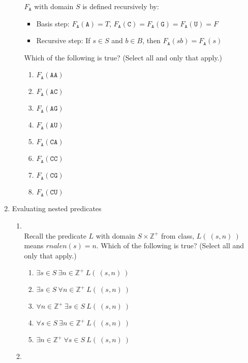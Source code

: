 \documentclass[12pt, oneside]{article}
\newcommand{\A}[0]{\texttt{A}}
\newcommand{\C}[0]{\texttt{C}}
\newcommand{\G}[0]{\texttt{G}}
\newcommand{\U}[0]{\texttt{U}}
\begin{document}
\begin{enumerate}
\begin{enumerate}
$F_{\A}$ with domain $S$ is defined recursively by: 
\begin{itemize}
\item[]Basis step: $F_{\A}(\A) = T$, $F_{\A}(\C) = F_{\A}(\G) = F_{\A}(\U) = F$
\item[]Recursive step: If $s \in S$ and $b \in B$, then $F_{\A}(sb) = F_{\A}(s)$
\end{itemize}

Which of the following is true? (Select  all and only that apply.)
 \begin{enumerate}
    \item $F_\A ( \A\A)$
    \item $F_\A ( \A\C)$
    \item $F_\A ( \A\G)$
    \item $F_\A ( \A\U)$
    \item $F_\A ( \C\A)$
    \item $F_\A ( \C\C)$
    \item $F_\A ( \C\G)$
    \item $F_\A ( \C\U)$
 \end{enumerate}    
     \end{enumerate}
\newpage
\item Evaluating nested predicates
    \begin{enumerate}
    \item \hspace{1in}\\

Recall the predicate $L$ with domain $S \times \mathbb{Z}^+$ from class,
$L(~(s,n)~)$ means $rnalen(s) = n$.
Which of the following is true? (Select  all and only that apply.)
\begin{enumerate}
   \item $\exists s \in S ~\exists n \in \mathbb{Z}^+ ~L(~(s,n)~)$
   \item $\exists s \in S ~\forall n \in \mathbb{Z}^+ ~L(~(s,n)~)$
   \item $\forall n \in \mathbb{Z}^+ ~\exists s \in S ~L(~(s,n)~)$
   \item $\forall s \in S ~\exists n \in \mathbb{Z}^+ ~L(~(s,n)~)$
   \item $\exists n \in \mathbb{Z}^+ ~\forall s \in S ~L(~(s,n)~)$
\end{enumerate} 
     \item \hspace{1in}\\


\end{enumerate}
\end{enumerate}
\end{document}
